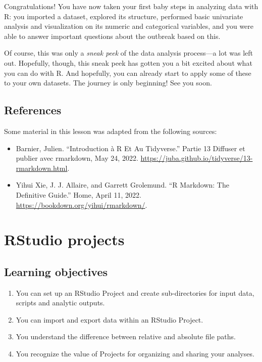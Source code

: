 \documentclass[
  letterpaper,
  DIV=11,
  numbers=noendperiod]{scrreprt}
\begin{document}
Congratulations! You have now taken your first baby steps in analyzing
data with R: you imported a dataset, explored its structure, performed
basic univariate analysis and visualization on its numeric and
categorical variables, and you were able to answer important questions
about the outbreak based on this.

Of course, this was only a \emph{sneak peek} of the data analysis
process---a lot was left out. Hopefully, though, this sneak peek has
gotten you a bit excited about what you can do with R. And hopefully,
you can already start to apply some of these to your own datasets. The
journey is only beginning! See you soon.

\section*{References}\label{references-3}


Some material in this lesson was adapted from the following sources:

\begin{itemize}
\item
  Barnier, Julien. ``Introduction à R Et Au Tidyverse.'' Partie 13
  Diffuser et publier avec rmarkdown, May 24, 2022.
  \url{https://juba.github.io/tidyverse/13-rmarkdown.html}.
\item
  Yihui Xie, J. J. Allaire, and Garrett Grolemund. ``R Markdown: The
  Definitive Guide.'' Home, April 11, 2022.
  \url{https://bookdown.org/yihui/rmarkdown/}.
\end{itemize}

\chapter{RStudio projects}\label{rstudio-projects}

\section{Learning objectives}\label{learning-objectives-3}

\begin{enumerate}
\def\labelenumi{\arabic{enumi}.}
\item
  You can set up an RStudio Project and create sub-directories for input
  data, scripts and analytic outputs.
\item
  You can import and export data within an RStudio Project.
\item
  You understand the difference between relative and absolute file
  paths.
\item
  You recognize the value of Projects for organizing and sharing your
  analyses.
\end{enumerate}
\end{document}
